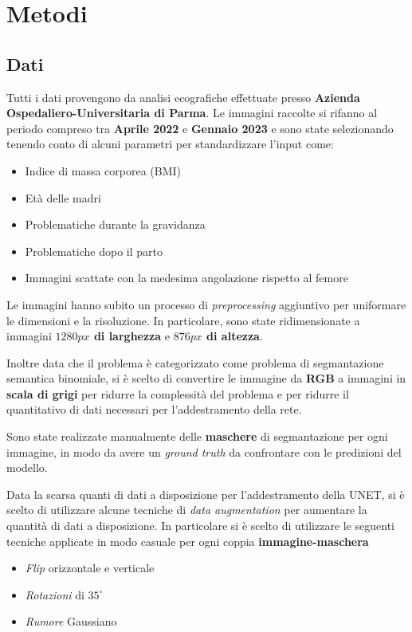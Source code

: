 \section{Metodi}
\subsection{Dati}

Tutti i dati provengono da analisi ecografiche effettuate presso \textbf{Azienda Ospedaliero-Universitaria di Parma}.
Le immagini raccolte si rifanno al periodo compreso tra \textbf{Aprile 2022} e \textbf{Gennaio 2023} e sono state selezionando tenendo conto di alcuni parametri per standardizzare l'input come:
\begin{itemize}
  \item Indice di massa corporea (BMI)
  \item Età delle madri
  \item Problematiche durante la gravidanza
  \item Problematiche dopo il parto
  \item Immagini scattate con la medesima angolazione rispetto al femore
\end{itemize}


Le immagini hanno subito un processo di \textit{preprocessing} aggiuntivo per uniformare le dimensioni e la risoluzione. In particolare, sono state ridimensionate a immagini \textbf{$1280px$ di larghezza} e \textbf{$876px$ di altezza}.


Inoltre data che il problema è categorizzato come problema di segmantazione semantica binomiale, si è scelto di convertire le immagine da \textbf{RGB} a immagini in \textbf{scala di grigi} per ridurre la complessità del problema e per ridurre il quantitativo di dati necessari per l'addestramento della rete.


Sono state realizzate manualmente delle \textbf{maschere} di segmantazione per ogni immagine, in modo da avere un \textit{ground truth} da confrontare con le predizioni del modello.


Data la scarsa quanti di dati a disposizione per l'addestramento della UNET, si è scelto di utilizzare alcune tecniche di \textit{data augmentation} per aumentare la quantità di dati a disposizione. In particolare si è scelto di utilizzare le seguenti tecniche applicate in modo casuale per ogni coppia \textbf{immagine-maschera}
\begin{itemize}
	\item \textit{Flip} orizzontale e verticale
	\item \textit{Rotazioni} di $35^{\circ}$
	\item \textit{Rumore} Gaussiano
\end{itemize}

